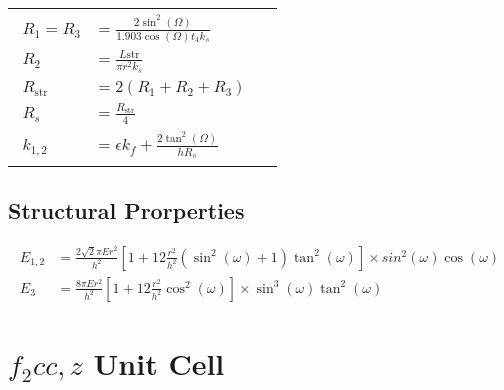 \begin{table}[ht]
\begin{tabular}{c | c}
{\begin{equation*}
\begin{split}
                R_1 = R_3 &= \frac{2\sin^2(\Omega)}{1.903\cos(\Omega)t_4k_s} \\
                R_2 &= \frac{L\text{str}}{\pi r^2k_s} \\
                R_\text{str} &= 2(R_1 + R_2 + R_3) \\
                R_s &= \frac{R_\text{str}}{4} \\
                k_{1,2} &= \epsilon k_f + \frac{2\tan^2(\Omega)}{hR_s}
            \end{split}
        \end{equation*} 
        }
    \end{tabular}
\end{table}


\subsection*{Structural Prorperties}
\begin{equation*}
    \begin{split}
        E_{1,2} &=\frac{2\sqrt{2}\pi Er^2}{h^2}\left[ 1 + 12\frac{r^2}{h^2}\left(\sin^2(\omega)+1\right)\tan^2(\omega) \right]\times sin^2(\omega)\cos(\omega) \\
        E_3 &=\frac{8\pi Er^2}{h^2}\left[ 1 + 12\frac{r^2}{h^2}\cos^2(\omega) \right]\times \sin^3(\omega)\tan^2(\omega)
    \end{split}
\end{equation*}
    

\vfill \pagebreak
\section*{$f_2cc,z$ Unit Cell}
